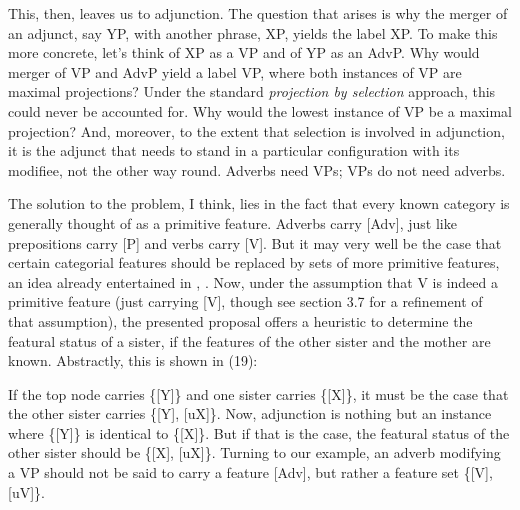 \documentclass[output=paper
,modfonts
,nonflat]{langsci/langscibook}
\begin{document}
This, then, leaves us to adjunction. The question that arises is why the merger of an adjunct, say YP, with another phrase, XP, yields the label XP. To make this more concrete, let’s think of XP as a VP and of YP as an AdvP. Why would merger of VP and AdvP yield a label VP, where both instances of VP are maximal projections? Under the standard \textit{projection by selection} approach, this could never be accounted for. Why would the lowest instance of VP be a maximal projection? And, moreover, to the extent that selection is involved in adjunction, it is the adjunct that needs to stand in a particular configuration with its modifiee, not the other way round. Adverbs need VPs; VPs do not need adverbs. 

The solution to the problem, I think, lies in the fact that every known category is generally thought of as a primitive feature. Adverbs carry [Adv], just like prepositions carry [P] and verbs carry [V]. But it may very well be the case that certain categorial features should be replaced by sets of more primitive features, an idea already entertained in \citet{Chomsky1970}, \citet{Chomsky1981}. Now, under the assumption that V is indeed a primitive feature (just carrying [V], though see section 3.7 for a refinement of that assumption), the presented proposal offers a heuristic to determine the featural status of a sister, if the features of the other sister and the mother are known. Abstractly, this is shown in (19): 

\begin{figure}[!h]
	\begin{exe}
	\end{exe}
\end{figure} 
\noindent If the top node carries \{[Y]\} and one sister carries \{[X]\}, it must be the case that the other sister carries \{[Y], [uX]\}. Now, adjunction is nothing but an instance where \{[Y]\} is identical to \{[X]\}. But if that is the case, the featural status of the other sister should be \{[X], [uX]\}. 
Turning to our example, an adverb modifying a VP should not be said to carry a feature [Adv], but rather a feature set \{[V], [uV]\}.
\end{document}
